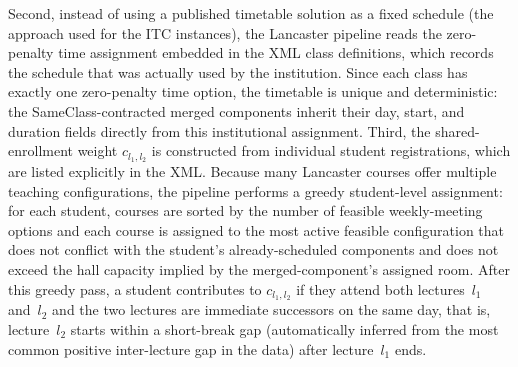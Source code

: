 \documentclass[11pt]{article}
\begin{document}
Second, instead of using a published timetable solution as a fixed schedule (the approach used for the ITC instances), the Lancaster pipeline reads the zero-penalty time assignment embedded in the XML class definitions, which records the schedule that was actually used by the institution. Since each class has exactly one zero-penalty time option, the timetable is unique and deterministic: the SameClass-contracted merged components inherit their day, start, and duration fields directly from this institutional assignment. Third, the shared-enrollment weight $c_{l_1,l_2}$ is constructed from individual student registrations, which are listed explicitly in the XML. Because many Lancaster courses offer multiple teaching configurations, the pipeline performs a greedy student-level assignment: for each student, courses are sorted by the number of feasible weekly-meeting options and each course is assigned to the most active feasible configuration that does not conflict with the student's already-scheduled components and does not exceed the hall capacity implied by the merged-component's assigned room. After this greedy pass, a student contributes to $c_{l_1,l_2}$ if they attend both lectures~$l_1$ and~$l_2$ and the two lectures are immediate successors on the same day, that is, lecture~$l_2$ starts within a short-break gap (automatically inferred from the most common positive inter-lecture gap in the data) after lecture~$l_1$ ends.
\end{document}

